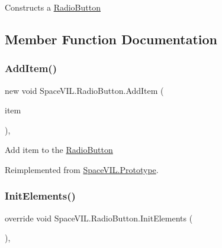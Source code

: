 Constructs a \mbox{\hyperlink{class_space_v_i_l_1_1_radio_button}{Radio\+Button}} 



\subsection{Member Function Documentation}
\mbox{\label{class_space_v_i_l_1_1_radio_button_a43667256c2474219e4772d2dbb112367}} 
\subsubsection{\texorpdfstring{Add\+Item()}{AddItem()}}
{\footnotesize\ttfamily new void Space\+V\+I\+L.\+Radio\+Button.\+Add\+Item (\begin{DoxyParamCaption}\item[{\mbox{\hyperlink{interface_space_v_i_l_1_1_core_1_1_i_base_item}{I\+Base\+Item}}}]{item }\end{DoxyParamCaption})\hspace{0.3cm}{\ttfamily [inline]}, {\ttfamily [virtual]}}



Add item to the \mbox{\hyperlink{class_space_v_i_l_1_1_radio_button}{Radio\+Button}} 



Reimplemented from \mbox{\hyperlink{class_space_v_i_l_1_1_prototype}{Space\+V\+I\+L.\+Prototype}}.

\mbox{\label{class_space_v_i_l_1_1_radio_button_a2f31e5a88432a2bff6a9a9608da0d93f}} 
\subsubsection{\texorpdfstring{Init\+Elements()}{InitElements()}}
{\footnotesize\ttfamily override void Space\+V\+I\+L.\+Radio\+Button.\+Init\+Elements (\begin{DoxyParamCaption}{ }\end{DoxyParamCaption})\hspace{0.3cm}{\ttfamily [inline]}, {\ttfamily [virtual]}}



